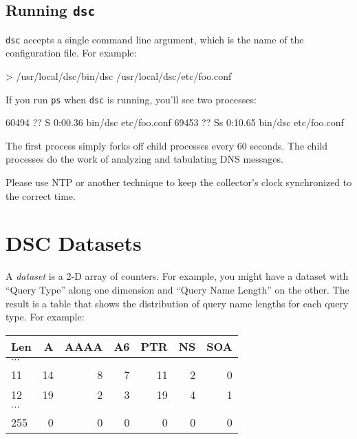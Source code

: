 \documentclass{report}
\begin{document}
\section{Running {\tt dsc}}

{\tt dsc\/} accepts a single command line argument, which is
the name of the configuration file.  For example:

\begin{MyVerbatim}
> /usr/local/dsc/bin/dsc /usr/local/dsc/etc/foo.conf
\end{MyVerbatim}

If you run {\tt ps} when {\tt dsc} is running, you'll see two processes:

\begin{MyVerbatim}
60494  ??  S      0:00.36 bin/dsc etc/foo.conf
69453  ??  Ss     0:10.65 bin/dsc etc/foo.conf
\end{MyVerbatim}

The first process simply forks off child processes every
60 seconds.  The child processes do the work of analyzing
and tabulating DNS messages.

Please use NTP or another technique to keep the collector's
clock synchronized to the correct time.


\chapter{DSC Datasets}

A {\em dataset\/} is a 2-D array of counters.  For example, you
might have a dataset with ``Query Type'' along one dimension and
``Query Name Length'' on the other.  The result is a table that
shows the distribution of query name lengths for each query type.
For example:

\vspace{1ex}
\begin{center}
\begin{tabular}{l|rrrrrr}
Len & A & AAAA & A6 & PTR & NS & SOA \\
\hline
$\cdots$ & & & & & \\
11 & 14 & 8 & 7 & 11 & 2 & 0 \\
12 & 19 & 2 & 3 & 19 & 4 & 1 \\
$\cdots$ & & & & & & \\
255 & 0 & 0 & 0 & 0 & 0 & 0 \\
\hline
\end{tabular}
\end{center}
\vspace{1ex}
\end{document}
